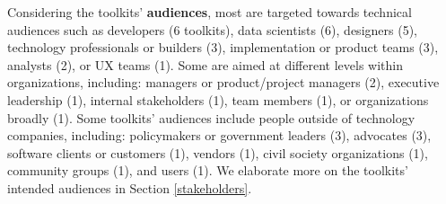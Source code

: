 \documentclass[acmsmall]{acmart}
\begin{document}
Considering the toolkits' \textbf{audiences}, most are targeted towards technical audiences such as developers (6 toolkits), data scientists (6), designers (5), technology professionals or builders (3), implementation or product teams (3), analysts (2), or UX teams (1). Some are aimed at different levels within organizations, including: managers or product/project managers (2), executive leadership (1), internal stakeholders (1), team members (1), or organizations broadly (1). Some toolkits' audiences include people outside of technology companies, including: policymakers or government leaders (3), advocates (3), software clients or customers (1), vendors (1), civil society organizations (1), community groups (1), and users (1). We elaborate more on the toolkits' intended audiences in Section \ref{stakeholders}.
\end{document}
